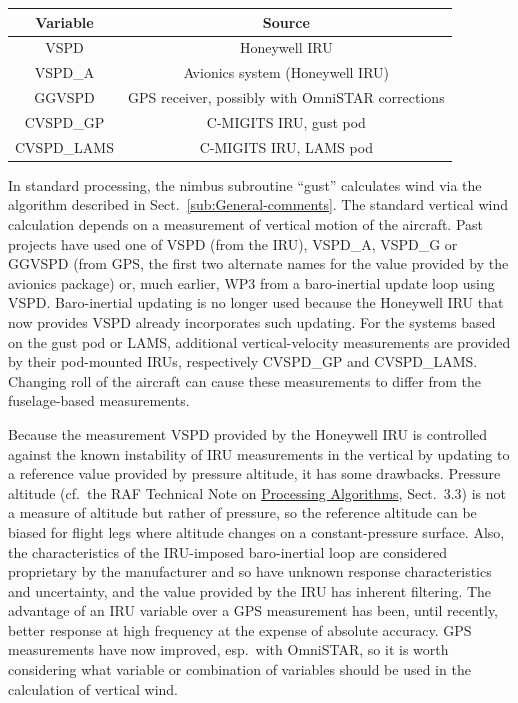 \documentclass[12pt,twoside,english]{article}\usepackage[]{graphicx}\usepackage[]{color}
\providecommand{\tabularnewline}{\\}
\let\OrgIndex\index
\renewcommand*{\index}[1]{\OrgIndex{#1}}
\begin{document}
\noindent \begin{center}
\begin{tabular}{|c|c|}
\hline 
\textbf{Variable}  &
\textbf{Source}\tabularnewline
\hline 
\hline 
VSPD  &
Honeywell IRU\tabularnewline
\hline 
VSPD\_A  &
Avionics system (Honeywell IRU)\tabularnewline
\hline 
GGVSPD  &
GPS receiver, possibly with OmniSTAR corrections\tabularnewline
\hline 
CVSPD\_GP  &
C-MIGITS IRU, gust pod\tabularnewline
\hline 
CVSPD\_LAMS  &
C-MIGITS IRU, LAMS pod\tabularnewline
\hline 
\end{tabular}
\par\end{center}

In standard processing, the nimbus subroutine ``gust''
calculates wind via the algorithm described in Sect.~\ref{sub:General-comments}.
The standard vertical wind calculation depends on a measurement of
vertical motion of the aircraft. Past projects have used one of VSPD
(from the IRU), VSPD\_A, VSPD\_G or GGVSPD (from GPS, the first two
alternate names for the value provided by the avionics package) or,
much earlier, WP3 from a baro-inertial update loop using VSPD. Baro-inertial
updating is no longer used because the Honeywell IRU that now provides
VSPD already incorporates such updating. For the systems based on
the gust pod or LAMS, additional vertical-velocity measurements are
provided by their pod-mounted IRUs, respectively CVSPD\_GP and CVSPD\_LAMS.
Changing roll of the aircraft can cause these measurements to differ
from the fuselage-based measurements.

Because the measurement VSPD provided by the Honeywell IRU is controlled against the known instability of IRU measurements in the vertical by updating to a reference value provided by pressure altitude, it has some drawbacks. Pressure altitude (cf.~the RAF Technical Note on \href{https://drive.google.com/open?id=0B1kIUH45ca5Ab2Z6cld1M1cydjA&authuser=0}{Processing Algorithms}, Sect.~3.3) is not a measure of altitude but rather of pressure, so the reference altitude can be biased for flight legs where altitude changes on a constant-pressure surface. Also, the characteristics of the IRU-imposed baro-inertial loop are considered proprietary by the manufacturer and so have unknown response characteristics and uncertainty, and the value provided by the IRU has inherent filtering. The advantage of an IRU variable over a GPS measurement has been, until recently, better response at high frequency at the expense of absolute accuracy. GPS measurements have now improved, esp.~with OmniSTAR, so it is worth considering what variable or combination of variables should be used in the calculation of vertical wind. 
\end{document}
